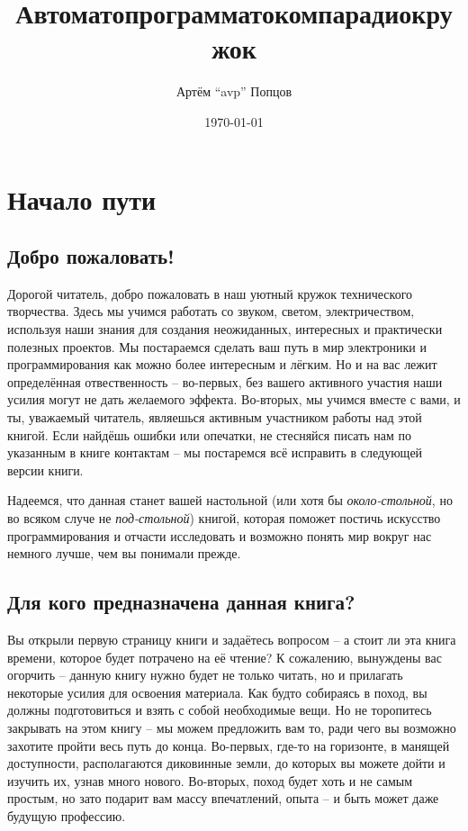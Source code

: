 \documentclass[a4paper,twoside]{book}
\title{Автоматопрограмматокомпарадиокружок}
\author{Артём ``avp'' Попцов}
\date{\today}
\begin{document}
\maketitle

\tableofcontents

\chapter{Начало пути}

\section{Добро пожаловать!}

Дорогой читатель, добро пожаловать в наш уютный кружок технического творчества.
Здесь мы учимся работать со звуком, светом, электричеством, используя наши
знания для создания неожиданных, интересных и практически полезных проектов. Мы
постараемся сделать ваш путь в мир электроники и программирования как можно
более интересным и лёгким. Но и на вас лежит определённая отвественность --
во-первых, без вашего активного участия наши усилия могут не дать желаемого
эффекта. Во-вторых, мы учимся вместе с вами, и ты, уважаемый читатель, являешься
активным участником работы над этой книгой. Если найдёшь ошибки или опечатки, не
стесняйся писать нам по указанным в книге контактам -- мы постаремся всё
исправить в следующей версии книги.

Надеемся, что данная станет вашей настольной (или хотя бы \emph{около-стольной},
но во всяком случе не \emph{под-стольной}) книгой, которая поможет постичь
искусство программирования и отчасти исследовать и возможно понять мир вокруг
нас немного лучше, чем вы понимали прежде.

\section{Для кого предназначена данная книга?}
Вы открыли первую страницу книги и задаётесь вопросом -- а стоит ли эта книга
времени, которое будет потрачено на её чтение? К сожалению, вынуждены вас
огорчить -- данную книгу нужно будет не только читать, но и прилагать некоторые
усилия для освоения материала. Как будто собираясь в поход, вы должны
подготовиться и взять с собой необходимые вещи. Но не торопитесь закрывать на
этом книгу -- мы можем предложить вам то, ради чего вы возможно захотите пройти
весь путь до конца. Во-первых, где-то на горизонте, в манящей доступности,
располагаются диковинные земли, до которых вы можете дойти и изучить их, узнав
много нового. Во-вторых, поход будет хоть и не самым простым, но зато подарит
вам массу впечатлений, опыта -- и быть может даже будущую профессию.
\end{document}
